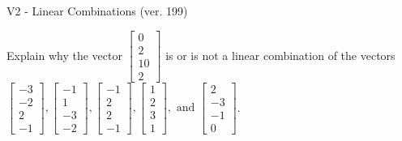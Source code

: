 \begin{exercise}
  \begin{exerciseTitle}V2 - Linear Combinations (ver. 199)\end{exerciseTitle}
  \begin{exerciseStatement}
    Explain why the vector \(\left[\begin{array}{c}
0 \\
2 \\
10 \\
2
\end{array}\right]\)  is or is not a linear 
	combination of the vectors \(\left[\begin{array}{c}
-3 \\
-2 \\
2 \\
-1
\end{array}\right] , \left[\begin{array}{c}
-1 \\
1 \\
-3 \\
-2
\end{array}\right] , \left[\begin{array}{c}
-1 \\
2 \\
2 \\
-1
\end{array}\right] , \left[\begin{array}{c}
1 \\
2 \\
3 \\
1
\end{array}\right] , \text{ and } \left[\begin{array}{c}
2 \\
-3 \\
-1 \\
0
\end{array}\right]\).
	



\end{exerciseStatement}
\end{exercise}

